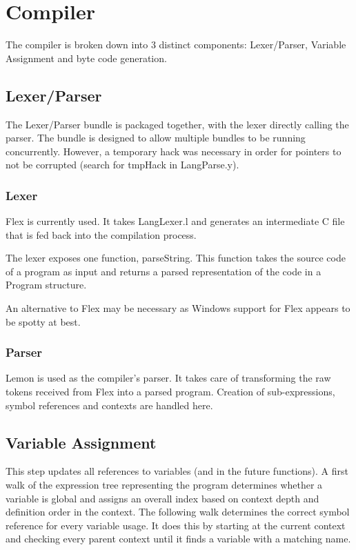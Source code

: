 \documentclass{standalone}
\begin{document}
\chapter{Compiler}
	The compiler is broken down into 3 distinct components: Lexer/Parser, Variable Assignment and byte code generation.

	\section{Lexer/Parser}
		The Lexer/Parser bundle is packaged together, with the lexer directly calling the parser. The bundle is designed to allow multiple bundles to be running concurrently. However, a temporary hack was necessary in order for pointers to not be corrupted (search for tmpHack in LangParse.y).
		\subsection{Lexer}
			Flex is currently used. It takes LangLexer.l and generates an intermediate C file that is fed back into the compilation process.

			The lexer exposes one function, parseString. This function takes the source code of a program as input and returns a parsed representation of the code in a Program structure.

			An alternative to Flex may be necessary as Windows support for Flex appears to be spotty at best.
		\subsection{Parser}
			Lemon is used as the compiler's parser. It takes care of transforming the raw tokens received from Flex into a parsed program. Creation of sub-expressions, symbol references and contexts are handled here.

	\section{Variable Assignment}
		This step updates all references to variables (and in the future functions). A first walk of the expression tree representing the program determines whether a variable is global and assigns an overall index based on context depth and definition order in the context. The following walk determines the correct symbol reference for every variable usage. It does this by starting at the current context and checking every parent context until it finds a variable with a matching name.
\end{document}
